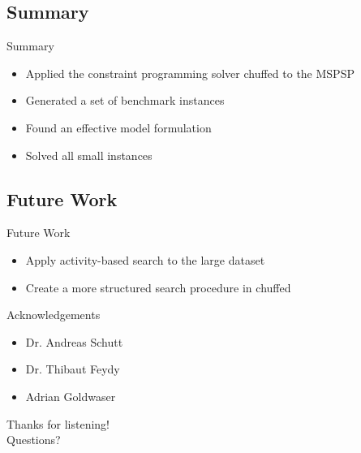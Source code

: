 \documentclass{beamer}
\begin{document}
\subsection{Summary}
\begin{frame}{Summary}
	\begin{itemize}
		\item Applied the constraint programming solver chuffed to the MSPSP\pause
		\vspace{2mm}
		\item Generated a set of benchmark instances\pause
		\vspace{2mm}
		\item Found an effective model formulation\pause
		\vspace{2mm}
		\item Solved all small instances
	\end{itemize}
\end{frame}

\subsection{Future Work}
\begin{frame}{Future Work}
	\begin{itemize}
		\item Apply activity-based search to the large dataset\pause
		\vspace{2mm}
		\item Create a more structured search procedure in chuffed
	\end{itemize}
\end{frame}

\begin{frame}{Acknowledgements}
	\begin{itemize}
		\item Dr. Andreas Schutt
		\vspace{2mm}
		\item Dr. Thibaut Feydy
		\vspace{2mm}
		\item Adrian Goldwaser
	\end{itemize}
\end{frame}

\begin{frame}{}
	\centering
	{\Large Thanks for listening!\vspace{1cm}\\
	Questions?}
\end{frame}
\end{document}

